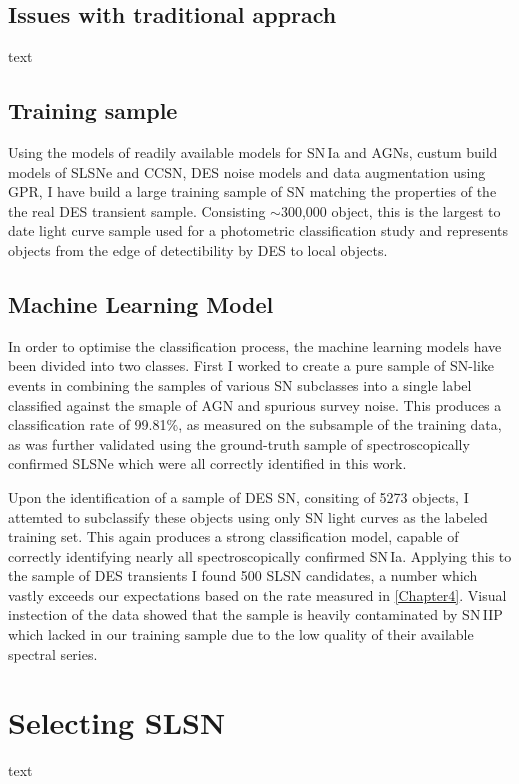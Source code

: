 \subsection{Issues with traditional apprach}
text

\subsection{Training sample}
Using the models of readily available models for SN\,Ia and AGNs, custum build models of SLSNe and CCSN, DES noise models and data augmentation using GPR, I have build a large training sample of SN matching the properties of the the real DES transient sample. Consisting $\sim$300,000 object, this is the largest to date light curve sample used for a photometric classification study and represents objects from the edge of detectibility by DES to local objects.

\subsection{Machine Learning Model}
In order to optimise the classification process, the machine learning models have been divided into two classes. First I worked to create a pure sample of SN-like events in combining the samples of various SN subclasses into a single label classified against the smaple of AGN and spurious survey noise. This produces a classification rate of 99.81\%, as measured on the subsample of the training data, as was further validated using the ground-truth sample of spectroscopically confirmed SLSNe which were all correctly identified in this work.

Upon the identification of a sample of DES SN, consiting of 5273 objects, I attemted to subclassify these objects using only SN light curves as the labeled training set. This again produces a strong classification model, capable of correctly identifying nearly all spectroscopically confirmed SN\,Ia. Applying this to the sample of DES transients I found 500 SLSN candidates, a number which vastly exceeds our expectations based on the rate measured in \cref{Chapter4}. Visual instection of the data showed that the sample is heavily contaminated by SN\,IIP which lacked in our training sample due to the low quality of their available spectral series.

\section{Selecting SLSN}
text

